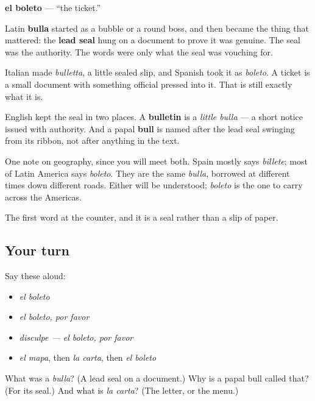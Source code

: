 \begin{cousinweb}
\textbf{el boleto} — \textquotedblleft{}the ticket.\textquotedblright{}

Latin \textbf{bulla} started as a bubble or a round boss, and then became the thing that mattered: the \textbf{lead seal} hung on a document to prove it was genuine. The seal was the authority. The words were only what the seal was vouching for.

Italian made \emph{bulletta}, a little sealed slip, and Spanish took it as \emph{boleto}. A ticket is a small document with something official pressed into it. That is still exactly what it is.

English kept the seal in two places. A \textbf{bulletin} is a \emph{little bulla} — a short notice issued with authority. And a papal \textbf{bull} is named after the lead seal swinging from its ribbon, not after anything in the text.

One note on geography, since you will meet both. Spain mostly says \emph{billete}; most of Latin America says \emph{boleto}. They are the same \emph{bulla}, borrowed at different times down different roads. Either will be understood; \emph{boleto} is the one to carry across the Americas.
\end{cousinweb}

\begin{grammarlens}[title={What you've built}]
The first word at the counter, and it is a seal rather than a slip of paper.
\end{grammarlens}

\subsection*{Your turn}
Say these aloud:

\begin{itemize}
\raggedright
  \item \emph{el boleto}
  \item \emph{el boleto, por favor}
  \item \emph{disculpe — el boleto, por favor}
  \item \emph{el mapa}, then \emph{la carta}, then \emph{el boleto}
\end{itemize}

\begin{tcolorbox}[breakable,colback=teal!4,colframe=teal!35!black,title={Before you move on}]
What was a \emph{bulla}? (A lead seal on a document.) Why is a papal bull called that? (For its seal.) And what is \emph{la carta}? (The letter, or the menu.)
\end{tcolorbox}
